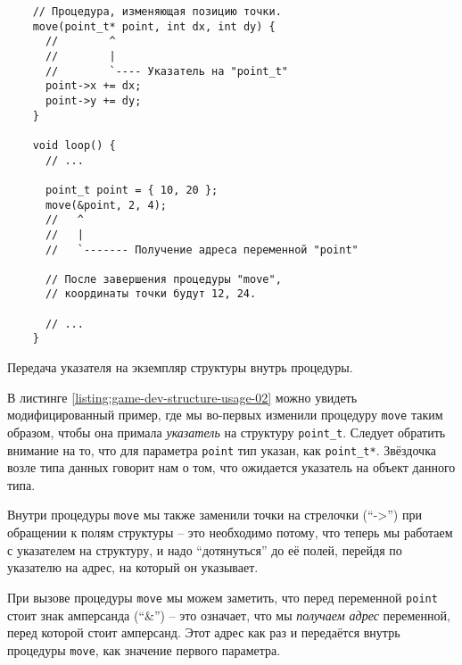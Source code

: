 \documentclass[../sparc.tex]{subfiles}
\begin{document}
\begin{listing}[H]
  \begin{verbatim}
    // Процедура, изменяющая позицию точки.
    move(point_t* point, int dx, int dy) {
      //        ^
      //        |
      //        `---- Указатель на "point_t"
      point->x += dx;
      point->y += dy;
    }

    void loop() {
      // ...

      point_t point = { 10, 20 };
      move(&point, 2, 4);
      //   ^
      //   |
      //   `------- Получение адреса переменной "point"

      // После завершения процедуры "move",
      // координаты точки будут 12, 24.

      // ...
    }
  \end{verbatim}
  \caption{Передача указателя на экземпляр структуры внутрь процедуры.}
  \label{listing:game-dev-structure-usage-02}
\end{listing}

В листинге \ref{listing:game-dev-structure-usage-02} можно увидеть
модифицированный пример, где мы во-первых изменили процедуру
\texttt{move} таким образом, чтобы она примала \emph{указатель} на
структуру \texttt{point_t}.  Следует обратить внимание на то, что для
параметра \texttt{point} тип указан, как \texttt{point_t*}.
Звёздочка возле типа данных говорит нам о том, что ожидается указатель на объект
данного типа.

Внутри процедуры \texttt{move} мы также заменили точки на стрелочки
(``->'') при обращении к полям структуры -- это необходимо потому, что теперь мы
работаем с указателем на структуру, и надо ``дотянуться'' до её полей, перейдя
по указателю на адрес, на который он указывает.

При вызове процедуры \texttt{move} мы можем заметить, что перед
переменной \texttt{point} стоит знак амперсанда (``\&'') -- это
означает, что мы \emph{получаем адрес} переменной, перед которой стоит
амперсанд.  Этот адрес как раз и передаётся внутрь процедуры
\texttt{move}, как значение первого параметра.
\end{document}
